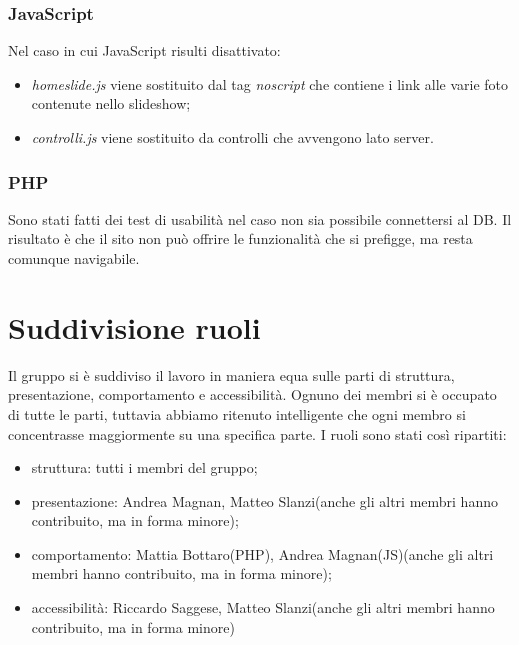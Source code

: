 	\subsubsection{JavaScript}
	Nel caso in cui JavaScript risulti disattivato:
	\begin{itemize}
	\item \textit{homeslide.js} viene sostituito dal tag \textit{noscript} che contiene i link alle varie foto contenute nello slideshow;
	\item \textit{controlli.js} viene sostituito da controlli che avvengono lato server.
	\end{itemize}
	\subsubsection{PHP}
	Sono stati fatti dei test di usabilità nel caso non sia possibile connettersi al DB. Il risultato è che il sito non può offrire le funzionalità che si prefigge, ma resta comunque navigabile.
	\section{Suddivisione ruoli}
	Il gruppo si è suddiviso il lavoro in maniera equa sulle parti di struttura, presentazione, comportamento e accessibilità.
	Ognuno dei membri si è occupato di tutte le parti, tuttavia abbiamo ritenuto intelligente che ogni membro si concentrasse maggiormente su una specifica parte.
	I ruoli sono stati così ripartiti:
	\begin{itemize}
		\item struttura: tutti i membri del gruppo;
		\item presentazione: Andrea Magnan, Matteo Slanzi(anche gli altri membri hanno contribuito, ma in forma minore);
		\item comportamento: Mattia Bottaro(PHP), Andrea Magnan(JS)(anche gli altri membri hanno contribuito, ma in forma minore);
		\item accessibilità: Riccardo Saggese, Matteo Slanzi(anche gli altri membri hanno contribuito, ma in forma minore)
	\end{itemize}
